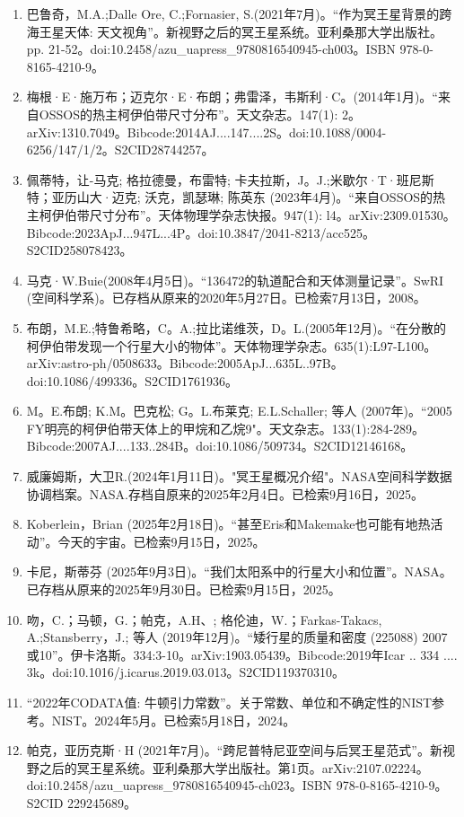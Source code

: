 \begin{enumerate}
\item 巴鲁奇，M.A.;Dalle Ore, C.;Fornasier, S.(2021年7月)。“作为冥王星背景的跨海王星天体: 天文视角”。新视野之后的冥王星系统。亚利桑那大学出版社。pp. 21-52。doi:10.2458/azu_uapress_9780816540945-ch003。ISBN 978-0-8165-4210-9。
\item 梅根·E·施万布；迈克尔·E·布朗；弗雷泽，韦斯利·C。(2014年1月)。“来自OSSOS的热主柯伊伯带尺寸分布”。天文杂志。147(1): 2。arXiv:1310.7049。Bibcode:2014AJ....147....2S。doi:10.1088/0004-6256/147/1/2。S2CID28744257。 
\item 佩蒂特，让-马克; 格拉德曼，布雷特; 卡夫拉斯，J。J.;米歇尔·T·班尼斯特；亚历山大·迈克; 沃克，凯瑟琳; 陈英东 (2023年4月)。“来自OSSOS的热主柯伊伯带尺寸分布”。天体物理学杂志快报。947(1): l4。arXiv:2309.01530。Bibcode:2023ApJ...947L...4P。doi:10.3847/2041-8213/acc525。S2CID258078423。 
\item 马克·W.Buie(2008年4月5日)。“136472的轨道配合和天体测量记录”。SwRI (空间科学系)。已存档从原来的2020年5月27日。已检索7月13日，2008。
\item 布朗，M.E.;特鲁希略，C。A.;拉比诺维茨，D。L.(2005年12月)。“在分散的柯伊伯带发现一个行星大小的物体”。天体物理学杂志。635(1):L97-L100。arXiv:astro-ph/0508633。Bibcode:2005ApJ...635L..97B。doi:10.1086/499336。S2CID1761936。  
\item M。E.布朗; K.M。巴克松; G。L.布莱克; E.L.Schaller; 等人 (2007年)。“2005 FY明亮的柯伊伯带天体上的甲烷和乙烷9"。天文杂志。133(1):284-289。Bibcode:2007AJ....133..284B。doi:10.1086/509734。S2CID12146168。 
\item 威廉姆斯，大卫R.(2024年1月11日)。"冥王星概况介绍"。NASA空间科学数据协调档案。NASA.存档自原来的2025年2月4日。已检索9月16日，2025。
\item Koberlein，Brian (2025年2月18日)。“甚至Eris和Makemake也可能有地热活动”。今天的宇宙。已检索9月15日，2025。
\item 卡尼，斯蒂芬 (2025年9月3日)。“我们太阳系中的行星大小和位置”。NASA。已存档从原来的2025年9月30日。已检索9月15日，2025。
\item 吻，C.；马顿，G.；帕克，A.H、; 格伦迪，W.；Farkas-Takacs, A.;Stansberry，J.; 等人 (2019年12月)。“矮行星的质量和密度 (225088) 2007或10”。伊卡洛斯。334:3-10。arXiv:1903.05439。Bibcode:2019年Icar .. 334 .... 3k。doi:10.1016/j.icarus.2019.03.013。S2CID119370310。 
\item “2022年CODATA值: 牛顿引力常数”。关于常数、单位和不确定性的NIST参考。NIST。2024年5月。已检索5月18日，2024。
\item 帕克，亚历克斯·H (2021年7月)。“跨尼普特尼亚空间与后冥王星范式”。新视野之后的冥王星系统。亚利桑那大学出版社。第1页。arXiv:2107.02224。doi:10.2458/azu_uapress_9780816540945-ch023。ISBN 978-0-8165-4210-9。S2CID 229245689。

\end{enumerate}
